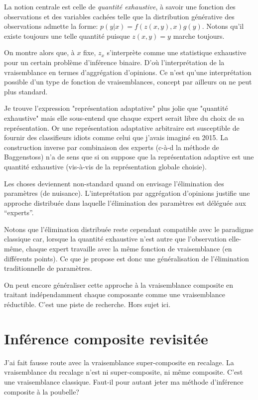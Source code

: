 \documentclass{article}
\begin{document}
La notion centrale est celle de {\em quantit\'e exhaustive}, \`a savoir une fonction des observations et des variables cach\'ees telle que la distribution g\'en\'erative des observations admette la forme: $p(y|x)=f(z(x,y),x)g(y)$. Notons qu'il existe toujours une telle quantit\'e puisque $z(x,y)=y$ marche toujours.

On montre alors que, \`a $x$ fixe, $z_x$ s'interpr\`ete comme une statistique exhaustive pour un certain probl\`eme d'inf\'erence binaire. D'o\`u l'interpr\'etation de la vraisemblance en termes d'aggr\'egation d'opinions. Ce n'est qu'une interpr\'etation possible d'un type de fonction de vraisemblances, concept par ailleurs on ne peut plus standard.

Je trouve l'expression "repr\'esentation adaptative" plus jolie que "quantit\'e exhaustive" mais elle sous-entend que chaque expert serait libre du choix de sa repr\'esentation. Or une repr\'esentation adaptative arbitraire est susceptible de fournir des classifieurs idiots comme celui que j'avais imagin\'e en 2015. La construction inverse par combinaison des experts (c-\`a-d la m\'ethode de Baggenstoss) n'a de sens que si on suppose que la repr\'esentation adaptive est une quantit\'e exhaustive (vis-\`a-vis de la repr\'esentation globale choisie).

Les choses deviennent non-standard quand on envisage l'\'elimination des param\`etres (de nuisance). L'intepr\'etation par aggr\'egation d'opinions justifie une approche distribu\'ee dans laquelle l'\'elimination des param\`etres est d\'el\'egu\'ee aux ``experts''. 

Notons que l'\'elimination distribu\'ee reste cependant compatible avec le paradigme classique car, lorsque la quantit\'e exhaustive n'est autre que l'observation elle-m\^eme, chaque expert travaille avec la m\^eme fonction de vraisemblance (en diff\'erents points). Ce que je propose est donc une g\'en\'eralisation de l'\'elimination traditionnelle de param\`etres.

On peut encore g\'en\'eraliser cette approche \`a la vraisemblance composite en traitant ind\'ependamment chaque composante comme une vraisemblance r\'eductible. C'est une piste de recherche. Hors sujet ici.


\section{Inf\'erence composite revisit\'ee}

J'ai fait fausse route avec la vraisemblance super-composite en recalage. La vraisemblance du recalage n'est ni super-composite, ni m\^eme composite. C'est une vraisemblance classique. Faut-il pour autant jeter ma m\'ethode d'inf\'erence composite \`a la poubelle?
\end{document}
